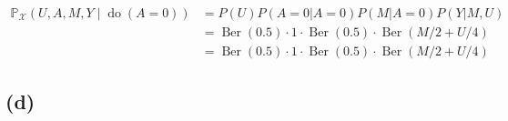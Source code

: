 \documentclass[10pt]{article}
\begin{document}
\begin{align*}
    \mathbb{P}_{\mathcal{X}}(U, A, M, Y \mid \operatorname{do}(A=0)) &=  P(U)P(A=0|A=0)P(M|A=0)P(Y|M, U)\\
    &= \operatorname{Ber}(0.5)\cdot1\cdot\operatorname{Ber}(0.5)\cdot\operatorname{Ber}(M/2 + U/4)\\
    &= \operatorname{Ber}(0.5)\cdot1\cdot\operatorname{Ber}(0.5)\cdot\operatorname{Ber}(M/2 + U/4)
\end{align*}    
        

\subsection{(d)}
\end{document}
